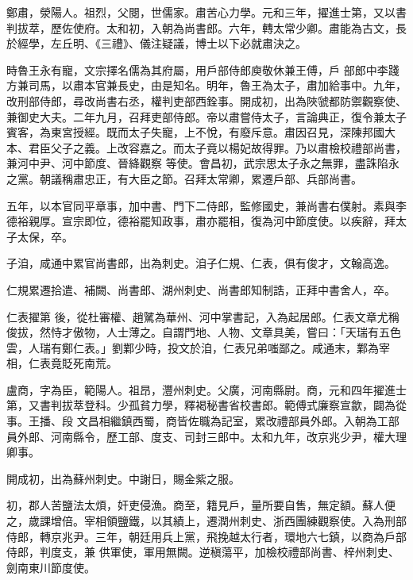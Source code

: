 \begin{pinyinscope}
 鄭肅，滎陽人。祖烈，父閱，世儒家。肅苦心力學。元和三年，擢進士第，又以書判拔萃，歷佐使府。太和初，入朝為尚書郎。六年，轉太常少卿。肅能為古文，長於經學，左丘明、《三禮》、儀注疑議，博士以下必就肅決之。



 時魯王永有寵，文宗擇名儒為其府屬，用戶部侍郎庾敬休兼王傅，戶
 部郎中李踐方兼司馬，以肅本官兼長史，由是知名。明年，魯王為太子，肅加給事中。九年，改刑部侍郎，尋改尚書右丞，權判吏部西銓事。開成初，出為陜虢都防禦觀察使、兼御史大夫。二年九月，召拜吏部侍郎。帝以肅嘗侍太子，言論典正，復令兼太子賓客，為東宮授經。既而太子失寵，上不悅，有廢斥意。肅因召見，深陳邦國大本、君臣父子之義。上改容嘉之。而太子竟以楊妃故得罪。乃以肅檢校禮部尚書，兼河中尹、河中節度、晉絳觀察
 等使。會昌初，武宗思太子永之無罪，盡誅陷永之黨。朝議稱肅忠正，有大臣之節。召拜太常卿，累遷戶部、兵部尚書。



 五年，以本官同平章事，加中書、門下二侍郎，監修國史，兼尚書右僕射。素與李德裕親厚。宣宗即位，德裕罷知政事，肅亦罷相，復為河中節度使。以疾辭，拜太子太保，卒。



 子洎，咸通中累官尚書郎，出為刺史。洎子仁規、仁表，俱有俊才，文翰高逸。



 仁規累遷拾遣、補闕、尚書郎、湖州刺史、尚書郎知制誥，正拜中書舍人，卒。



 仁表擢第
 後，從杜審權、趙騭為華州、河中掌書記，入為起居郎。仁表文章尤稱俊拔，然恃才傲物，人士薄之。自謂門地、人物、文章具美，嘗曰：「天瑞有五色雲，人瑞有鄭仁表。」劉鄴少時，投文於洎，仁表兄弟嗤鄙之。咸通末，鄴為宰相，仁表竟貶死南荒。



 盧商，字為臣，範陽人。祖昂，灃州刺史。父廣，河南縣尉。商，元和四年擢進士第，又書判拔萃登科。少孤貧力學，釋褐秘書省校書郎。範傅式廉察宣歙，闢為從事。王播、段
 文昌相繼鎮西蜀，商皆佐職為記室，累改禮部員外郎。入朝為工部員外郎、河南縣令，歷工部、度支、司封三郎中。太和九年，改京兆少尹，權大理卿事。



 開成初，出為蘇州刺史。中謝日，賜金紫之服。



 初，郡人苦鹽法太煩，奸吏侵漁。商至，籍見戶，量所要自售，無定額。蘇人便之，歲課增倍。宰相領鹽鐵，以其績上，遷潤州刺史、浙西團練觀察使。入為刑部侍郎，轉京兆尹。三年，朝廷用兵上黨，飛挽越太行者，環地六七鎮，以商為戶部侍郎，判度支，兼
 供軍使，軍用無闕。逆稹蕩平，加檢校禮部尚書、梓州刺史、劍南東川節度使。




\end{pinyinscope}
